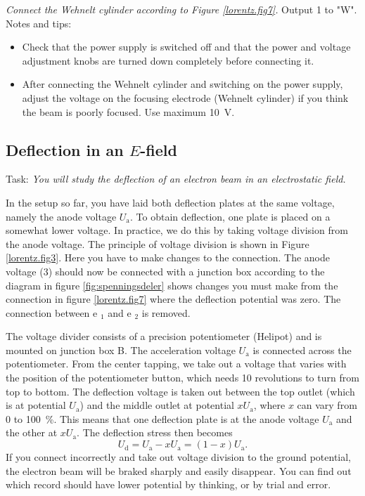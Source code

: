 \documentclass[../Elmag-labhefte-2020.tex]{subfiles}
\begin{document}
\emph{Connect the Wehnelt cylinder according to Figure \ref{lorentz.fig7}.}
Output 1 to "W".
Notes and tips:
\begin{itemize}
    \item Check that the power supply is switched off and that the power and voltage adjustment knobs are turned down completely before connecting it.
    \item After connecting the Wehnelt cylinder and switching on the power supply, adjust the voltage on the focusing electrode (Wehnelt cylinder) if you think the beam is poorly focused. Use maximum \SI{10}{\volt}.
\end{itemize}
\newpage

\subsection{Deflection in an \(E\)-field}

Task:
\emph{You will study the deflection of an electron beam in an electrostatic field.}

In the setup so far, you have laid both deflection plates at the same voltage, namely the anode voltage $U_\mathrm{a}$. To obtain deflection, one plate is placed on a somewhat lower voltage. In practice, we do this by taking voltage division from the anode voltage. The principle of voltage division is shown in Figure \ref{lorentz.fig3}. Here you have to make changes to the connection. The anode voltage (3) should now be connected with a junction box according to the diagram in figure \ref{fig:spenningsdeler} shows changes you must make from the connection in figure \ref{lorentz.fig7} where the deflection potential was zero. The connection between e $_1$ and e $_2$ is removed.


The voltage divider consists of a precision potentiometer (Helipot) and is mounted on junction box B. The acceleration voltage $U_\mathrm{a}$ is connected across the potentiometer. From the center tapping, we take out a voltage that varies with the position of the potentiometer button, which needs 10 revolutions to turn from top to bottom. The deflection voltage is taken out between the top outlet (which is at potential $U_\mathrm{a}$) and the middle outlet at potential $x  U_\mathrm{a}$, where $x$ can vary from 0 to \SI{100}{\percent}. This means that one deflection plate is at the anode voltage $U_\mathrm{a}$ and the other at $x  U_\mathrm{a}$. The deflection stress then becomes
\begin{equation}
    U_\mathrm{d} 
        = U_\mathrm{a} - x U_\mathrm{a} 
        = (1 - x) U_\mathrm{a}.
\end{equation}
If you connect incorrectly and take out voltage division to the ground potential, the electron beam will be braked sharply and easily disappear. You can find out which record should have lower potential by thinking, or by trial and error.
\end{document}
